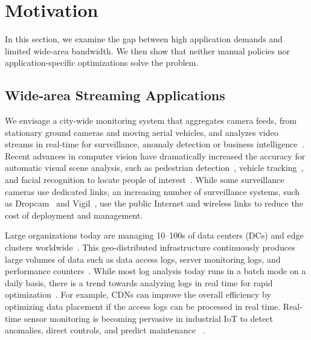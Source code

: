 \section{Motivation}
\label{sec:motivation}

In this section, we examine the gap between high application demands and limited
wide-area bandwidth. We then show that neither manual policies nor
application-specific optimizations solve the problem.

\subsection{Wide-area Streaming Applications}
\label{sec:wide-area-streaming}

 We envisage a city-wide monitoring system that
aggregates camera feeds, from stationary ground cameras and moving aerial
vehicles, and analyzes video streams in real-time for surveillance, anomaly
detection or business intelligence~\cite{oh2011large}. Recent advances in
computer vision have dramatically increased the accuracy for automatic visual
scene analysis, such as pedestrian detection~\cite{dollar2012pedestrian},
vehicle tracking~\cite{coifman1998real}, and facial recognition to locate people
of interest~\cite{Lu:2015:SHF:2888116.2888245, parkhi2015deep}. While some
surveillance cameras use dedicated links, an increasing number of surveillance
systems, such as Dropcam~\cite{dropcam} and Vigil~\cite{zhang2015design}, use
the public Internet and wireless links to reduce the cost of deployment and
management.


 Large organizations today are managing
10--100s of data centers (DCs) and edge clusters
worldwide~\cite{calder2013mapping}. This geo-distributed infrastructure
continuously produces large volumes of data such as data access logs, server
monitoring logs, and performance counters~\cite{alspaugh2014analyzing,
  pu2015low, vulimiri2015global}. While most log analysis today runs in a batch
mode on a daily basis, there is a trend towards analyzing logs in real time for
rapid optimization~\cite{rabkin2014aggregation}. For example, CDNs can improve
the overall efficiency by optimizing data placement if the access logs can be
processed in real time. Real-time sensor monitoring is becoming pervasive in
industrial IoT to detect anomalies, direct controls, and predict maintenance
~\cite{balani2016enterprise, ge}.

